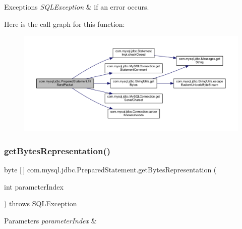 \begin{DoxyExceptions}{Exceptions}
{\em S\+Q\+L\+Exception} & if an error occurs. \\
\hline
\end{DoxyExceptions}
Here is the call graph for this function\+:
\nopagebreak
\begin{figure}[H]
\begin{center}
\leavevmode
\includegraphics[width=350pt]{classcom_1_1mysql_1_1jdbc_1_1_prepared_statement_a7012604554fada055dce8c36ece28ac7_cgraph}
\end{center}
\end{figure}
\mbox{\label{classcom_1_1mysql_1_1jdbc_1_1_prepared_statement_a9d7f8d794591450a31fc804150054196}} 
\subsubsection{\texorpdfstring{get\+Bytes\+Representation()}{getBytesRepresentation()}}
{\footnotesize\ttfamily byte \mbox{[}$\,$\mbox{]} com.\+mysql.\+jdbc.\+Prepared\+Statement.\+get\+Bytes\+Representation (\begin{DoxyParamCaption}\item[{int}]{parameter\+Index }\end{DoxyParamCaption}) throws S\+Q\+L\+Exception}


\begin{DoxyParams}{Parameters}
{\em parameter\+Index} & \\
\hline
\end{DoxyParams}

